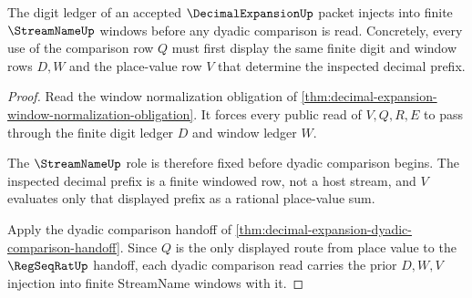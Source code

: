 \begin{theorem}
\label{thm:decimal-expansion-digit-ledger-injection}
The digit ledger of an accepted $\DecimalExpansionUp$ packet injects into finite $\StreamNameUp$ windows before any dyadic comparison is read. Concretely, every use of the comparison row $Q$ must first display the same finite digit and window rows $D,W$ and the place-value row $V$ that determine the inspected decimal prefix.
\end{theorem}
\begin{proof}
Read the window normalization obligation of \autoref{thm:decimal-expansion-window-normalization-obligation}. It forces every public read of $V,Q,R,E$ to pass through the finite digit ledger $D$ and window ledger $W$.

The $\StreamNameUp$ role is therefore fixed before dyadic comparison begins. The inspected decimal prefix is a finite windowed row, not a host stream, and $V$ evaluates only that displayed prefix as a rational place-value sum.

Apply the dyadic comparison handoff of \autoref{thm:decimal-expansion-dyadic-comparison-handoff}. Since $Q$ is the only displayed route from place value to the $\RegSeqRatUp$ handoff, each dyadic comparison read carries the prior $D,W,V$ injection into finite StreamName windows with it.
\end{proof}

